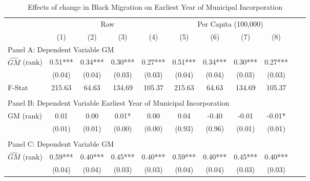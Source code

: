  \begin{table}[htbp]\centering {} \begin{threeparttable} \caption{Effects of change in Black Migration on Earliest Year of Municipal Incorporation} \begin{tabular}{l*{10}{c}} \toprule
                &\multicolumn{4}{c}{Raw}                                    &\multicolumn{4}{c}{Per Capita (100,000)}                   \\\cmidrule(lr){2-5}\cmidrule(lr){6-9}
                &\multicolumn{1}{c}{(1)}   &\multicolumn{1}{c}{(2)}   &\multicolumn{1}{c}{(3)}   &\multicolumn{1}{c}{(4)}   &\multicolumn{1}{c}{(5)}   &\multicolumn{1}{c}{(6)}   &\multicolumn{1}{c}{(7)}   &\multicolumn{1}{c}{(8)}   \\
\cmidrule(lr){1-9}
\multicolumn{8}{l}{Panel A: Dependent Variable GM}\\
\cmidrule(lr){1-9}
$\hat{GM}$ (rank)&       0.51***&       0.34***&       0.30***&       0.27***&       0.51***&       0.34***&       0.30***&       0.27***\\
                &     (0.04)   &     (0.04)   &     (0.03)   &     (0.03)   &     (0.04)   &     (0.04)   &     (0.03)   &     (0.03)   \\
\midrule
F-Stat          &     215.63   &      64.63   &     134.69   &     105.37   &     215.63   &      64.63   &     134.69   &     105.37   \\
\cmidrule[\heavyrulewidth](lr){1-9} \\ \cmidrule[\heavyrulewidth](lr){1-9}
\multicolumn{8}{l}{Panel B: Dependent Variable Earliest Year of Municipal Incorporation}\\
\cmidrule(lr){1-9}
GM  (rank)      &       0.01   &       0.00   &       0.01*  &       0.00   &       0.04   &      -0.40   &      -0.01   &      -0.01*  \\
                &     (0.01)   &     (0.01)   &     (0.00)   &     (0.00)   &     (0.93)   &     (0.96)   &     (0.01)   &     (0.01)   \\
\cmidrule[\heavyrulewidth](lr){1-9} \\ \cmidrule[\heavyrulewidth](lr){1-9}
\multicolumn{8}{l}{Panel C: Dependent Variable GM}\\
\cmidrule(lr){1-9}
$\hat{GM}$ (rank)&       0.59***&       0.40***&       0.45***&       0.40***&       0.59***&       0.40***&       0.45***&       0.40***\\
                &     (0.04)   &     (0.04)   &     (0.03)   &     (0.03)   &     (0.04)   &     (0.04)   &     (0.03)   &     (0.03)   \\

\end{tabular}
\end{threeparttable}
\end{table}
